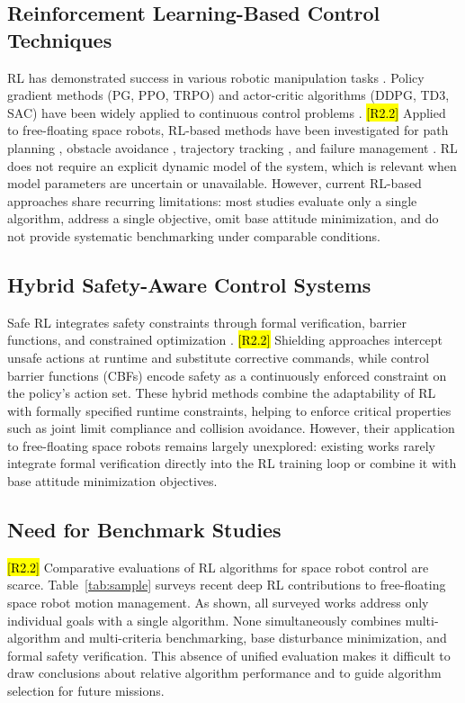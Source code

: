 \documentclass{ieeeaccess}
\newcommand{\hltwo}[1]{{\sethlcolor{rtwo}\hl{#1}}}
\newenvironment{rtwohl}
  {\def\FrameCommand{\colorbox{rtwo}}\MakeFramed{\advance\hsize-\width\FrameRestore}}
  {\endMakeFramed}
\begin{document}
\subsection{Reinforcement Learning-Based Control Techniques}
RL has demonstrated success in various robotic manipulation tasks \cite{b2,b7}.
Policy gradient methods (PG, PPO, TRPO) and actor-critic algorithms (DDPG, TD3, SAC)
have been widely applied to continuous control problems \cite{b14,b15,b17,b18,b21}.
\begin{rtwohl}
\hltwo{[R2.2]} Applied to free-floating space robots, RL-based methods have been investigated for path planning \cite{wu2020reinforcement,al2024path},
obstacle avoidance \cite{huang2023obstacle}, trajectory tracking \cite{hu2025deep}, and failure management \cite{d2024failure}.
RL does not require an explicit dynamic model of the system, which is relevant when model parameters are uncertain or unavailable. However, current RL-based approaches share recurring limitations: most studies
evaluate only a single algorithm, address a single objective, omit base attitude minimization, and do not provide systematic benchmarking under comparable conditions.
\end{rtwohl}

\subsection{Hybrid Safety-Aware Control Systems}
Safe RL integrates safety constraints through formal verification,
barrier functions, and constrained optimization \cite{b22,b23,b24,b34}.
\begin{rtwohl}
\hltwo{[R2.2]} Shielding approaches \cite{b23} intercept unsafe actions at runtime and substitute corrective commands,
while control barrier functions (CBFs) \cite{b34} encode safety as a continuously enforced constraint on the policy's action set.
These hybrid methods combine the adaptability of RL with formally specified runtime constraints, helping to enforce critical properties such as joint limit compliance
and collision avoidance. However, their application to free-floating space robots remains largely unexplored:
existing works rarely integrate formal verification directly into the RL training loop or combine it with base attitude minimization objectives.
\end{rtwohl}

\subsection{Need for Benchmark Studies}
\begin{rtwohl}
\hltwo{[R2.2]} Comparative evaluations of RL algorithms for space robot control are scarce. Table~\ref{tab:sample} surveys recent deep RL
contributions to free-floating space robot motion management. As shown, all surveyed works address only individual
goals with a single algorithm. None simultaneously combines multi-algorithm and multi-criteria benchmarking, base disturbance minimization,
and formal safety verification. This absence of unified evaluation makes it difficult to draw conclusions about relative
algorithm performance and to guide algorithm selection for future missions.
\end{rtwohl}
\end{document}
